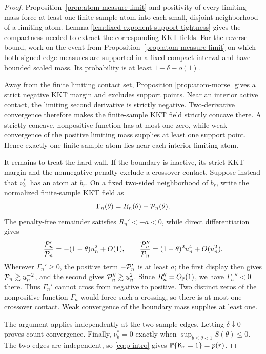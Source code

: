 \begin{proof}
Proposition~\ref{prop:atom-measure-limit} and positivity of every limiting
mass force at least one finite-sample atom into each small, disjoint
neighborhood of a limiting atom. Lemma
\ref{lem:fixed-exponent-support-tightness} gives the compactness needed to
extract the corresponding KKT fields. For the reverse bound, work on the
event from Proposition~\ref{prop:atom-measure-limit} on which both signed
edge measures are supported in a fixed compact interval and have bounded
scaled mass. Its probability is at least \(1-\delta-o(1)\).

Away from the finite limiting contact set, Proposition
\ref{prop:atom-morse} gives a strict negative KKT margin and excludes support
points. Near an interior active contact, the limiting second derivative is
strictly negative. Two-derivative convergence therefore makes the
finite-sample KKT field strictly concave there. A strictly concave,
nonpositive function has at most one zero, while weak convergence of the
positive limiting mass supplies at least one support point. Hence exactly one
finite-sample atom lies near each interior limiting atom.

It remains to treat the hard wall. If the boundary is inactive, its strict
KKT margin and the nonnegative penalty exclude a crossover contact. Suppose
instead that \(\nu_{b_r}^*\) has an atom at \(b_r\). On a fixed two-sided
neighborhood of \(b_r\), write the normalized finite-sample KKT field as
\[
    \Gamma_n(\theta)=R_n(\theta)-\mathcal P_n(\theta).
\]
The penalty-free remainder satisfies \(R_n'<-a<0\), while direct
differentiation gives
\[
    \frac{\mathcal P_n'}{\mathcal P_n}=-(1-\theta)u_n^2+O(1),
    \qquad
    \frac{\mathcal P_n''}{\mathcal P_n}
       =(1-\theta)^2u_n^4+O(u_n^2).
\]
Wherever \(\Gamma_n'\ge0\), the positive term \(-\mathcal P_n'\) is at least
\(a\); the first display then gives \(\mathcal P_n\gtrsim u_n^{-2}\), and the
second gives \(\mathcal P_n''\gtrsim u_n^2\). Since \(R_n''=O_{\mathbb{P}}(1)\), we have
\(\Gamma_n''<0\) there. Thus \(\Gamma_n'\) cannot cross from negative to
positive. Two distinct zeros of the nonpositive function \(\Gamma_n\) would
force such a crossing, so there is at most one crossover contact. Weak
convergence of the boundary mass supplies at least one.

The argument applies independently at the two sample edges. Letting
\(\delta\downarrow0\) proves count convergence. Finally,
\(\nu_b^*=0\) exactly when \(\sup_{b\le\theta<1}S(\theta)\le0\). The two
edges are independent, so \eqref{eq:p-intro} gives
\(\mathbb{P}\{\mathsf K_r=1\}=p(r)\).
\end{proof}


